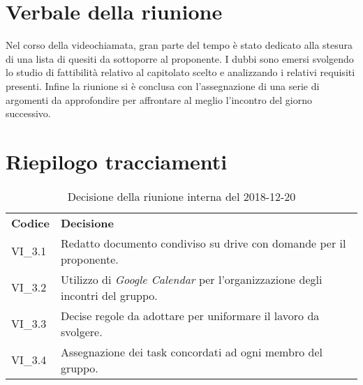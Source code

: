 \section{Verbale della riunione}
Nel corso della videochiamata, gran parte del tempo è stato dedicato alla 
stesura di una lista di quesiti da sottoporre al proponente. I dubbi sono emersi
svolgendo lo studio di fattibilità relativo al capitolato scelto e analizzando i
relativi requisiti presenti.
Infine la riunione si è conclusa con l'assegnazione di una serie di argomenti 
da approfondire per affrontare al meglio l'incontro del giorno 
successivo.

\section{Riepilogo tracciamenti}
\begin{table}[H]
	
	\begin{longtable}{ >{\centering}p{} >{\centering}p{}}
			
		\rowcolorhead
		\centering \textbf{\color{white}Codice} 
		& \centering \textbf{\color{white}Decisione} 
		
		\tabularnewline 
		VI\_3.1 & Redatto documento condiviso su drive con domande per il proponente.
		
		\tabularnewline 
		VI\_3.2 & Utilizzo di \textit{Google Calendar} per l'organizzazione degli 
				incontri del gruppo.
		
		\tabularnewline 
		VI\_3.3 & Decise regole da adottare per uniformare il lavoro da svolgere.
	
		\tabularnewline 
		VI\_3.4 & Assegnazione dei task concordati ad ogni membro del gruppo.
	
	\end{longtable}
	\caption{Decisione della riunione interna del 2018-12-20}	

\end{table}


